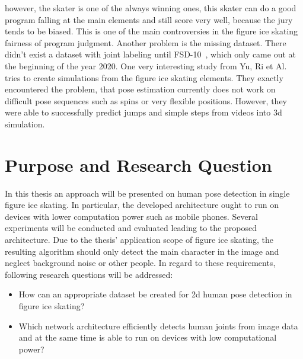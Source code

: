     however, the skater is one of the always winning
    ones, this skater can do a good program falling at the main elements and still score very well, because the
    jury tends to be biased.
    This is one of the main controversies in the figure ice skating fairness of program judgment.
    Another problem is the missing dataset.
    There didn't exist a dataset with joint labeling until FSD-10~\cite{fsd10}, which only came out at the
    beginning of the year 2020.
    One very interesting study from Yu, Ri et Al.~\cite{simplebaselines} tries to create simulations from the figure ice skating elements.
    They exactly encountered the problem, that pose estimation currently does not work on difficult pose sequences
    such as spins or very flexible positions.
    However, they were able to successfully predict jumps and simple steps from videos into 3d
    simulation.

    \section{Purpose and Research Question}
In this thesis an approach will be presented on human pose detection in single figure ice skating.
In particular, the developed architecture ought to run on devices with lower computation power such as mobile phones.
Several experiments will be conducted and evaluated leading to the proposed architecture.
Due to the thesis' application scope of figure ice skating, the resulting algorithm should only detect the main character in the image
and neglect background noise or other people.
In regard to these requirements, following research questions will be addressed:
\begin{itemize}
    \item How can an appropriate dataset be created for 2d human pose detection in figure ice skating?
    \item Which network architecture efficiently detects human joints from image data and at the same time is able to
    run on devices with low computational power?
\end{itemize}

